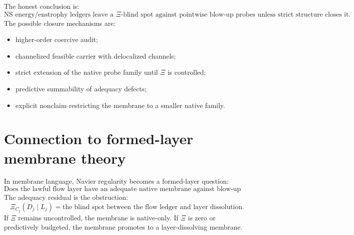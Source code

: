 \documentclass[11pt]{article}
\begin{document}
The honest conclusion is:
\[
\boxed{
\text{NS energy/enstrophy ledgers leave a }\Xi\text{-blind spot against pointwise blow-up probes unless strict structure closes it.}
}
\]
The possible closure mechanisms are:
\begin{itemize}[leftmargin=2em]
\item higher-order coercive audit;
\item channelized feasible carrier with delocalized channels;
\item strict extension of the native probe family until $\Xi$ is controlled;
\item predictive summability of adequacy defects;
\item explicit nonclaim restricting the membrane to a smaller native family.
\end{itemize}

\section{Connection to formed-layer membrane theory}
In membrane language, Navier regularity becomes a formed-layer question:
\[
\boxed{
\text{Does the lawful flow layer have an adequate native membrane against blow-up probes?}
}
\]
The adequacy residual is the obstruction:
\[
\boxed{
\Xi_{C_j}(D_j\mid L_j)=\text{the blind spot between the flow ledger and layer dissolution.}
}
\]
If $\Xi$ remains uncontrolled, the membrane is native-only.  If $\Xi$ is zero or predictively budgeted, the membrane promotes to a layer-dissolving membrane.
\end{document}

